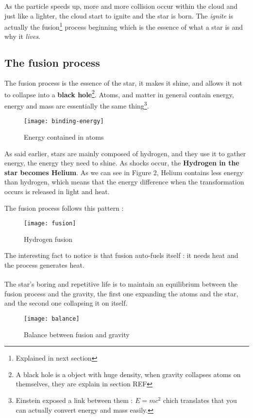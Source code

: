 \documentclass[a4paper, 11pt]{article} %
\begin{document}
As the particle speeds up, more and more collision occur within the cloud and just like a lighter, the cloud start to ignite and the star is born. The \textit{ignite} is actually the fusion\footnote{Explained in next section} process beginning which is the essence of what a star is and why it \textit{lives}.

\subsection{The fusion process}
The fusion process is the essence of the star, it makes it shine, and allows it not to collapse into a \textbf{black hole}\footnote{A black hole is a object with huge density, when gravity collapses atoms on themselves, they are explain in section REF}. Atoms, and matter in general contain energy, energy and mass are essentially the same thing\footnote{Einstein exposed a link between them : $E = mc^2$ chich translates that you can actually convert energy and mass easily.}. 


\begin{figure}[h]
\centering
\texttt{[image: binding-energy]}
\caption{Energy contained in atoms}
\end{figure}

As said earlier, stars are mainly composed of hydrogen, and they use it to gather energy, the energy they need to shine. As shocks occur, the \textbf{Hydrogen in the star becomes Helium}. As we can see in Figure 2, Helium contains less energy than hydrogen, which means that the energy difference when the transformation occurs is released in light and heat.

The fusion process follows this pattern :
\begin{figure}[h]
\centering
\texttt{[image: fusion]}
\caption{Hydrogen fusion}
\end{figure}

The interesting fact to notice is that fusion auto-fuels itself : it needs heat and the process generates heat.
\paragraph*{}
The star's boring and repetitive life is to maintain an equilibrium between the fusion process and the gravity, the first one expanding the atoms and the star, and the second one collapsing it on itself.

\begin{figure}[h]
\centering
\texttt{[image: balance]}
\caption{Balance between fusion and gravity}
\end{figure}
\end{document}
